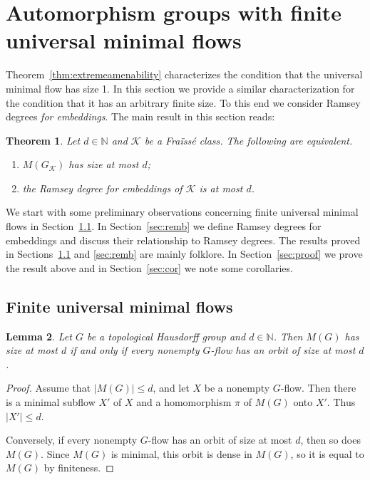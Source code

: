 \documentclass[12pt]{amsart}
\theoremstyle{plain}
\newtheorem{theorem}{Theorem}[section]
\newtheorem{lemma}[theorem]{Lemma}
\theoremstyle{definition}
\begin{document}
\section{Automorphism groups with finite universal minimal flows}

Theorem~\ref{thm:extremeamenability} characterizes the condition that the universal minimal flow has size 1. In this section we provide a similar characterization for the condition that it has an arbitrary finite size.
To this end we consider Ramsey degrees {\em for embeddings}. The main result in this section reads:

\begin{theorem}\label{thm:char}
Let $d\in{\mathbb N}$ and ${\mathcal K}$ be a Fra\"iss\'e class.
The following are equivalent.
\begin{enumerate}
\item $M(G_{\mathcal K})$ has size at most $d$;
\item  the Ramsey degree for embeddings of ${\mathcal K}$ is at most $d$.
\end{enumerate}
\end{theorem}

We start with some preliminary observations concerning finite universal minimal flows in Section~\ref{sec:finiteflow}. 
In Section~\ref{sec:remb} we define Ramsey degrees for embeddings and discuss their relationship to Ramsey 
degrees. The results proved in Sections~\ref{sec:finiteflow} and \ref{sec:remb} are mainly folklore.
In Section~\ref{sec:proof} we prove the result above and in 
Section~\ref{sec:cor}  we note some corollaries.

\subsection{Finite universal minimal flows}\label{sec:finiteflow}

\begin{lemma}\label{lem:orb}
 Let $G$ be a topological Hausdorff group and $d\in\mathbb N$. 
Then $M(G)$ has size at most $d$ if and only if every nonempty $G$-flow has an orbit of size at most $d$.
\end{lemma}

\begin{proof}
Assume that $|M(G)|\le d$, and let $X$ be a nonempty $G$-flow. Then there is a minimal subflow $X'$ of $X$ and 
a homomorphism $\pi$ of $M(G)$ onto $X'$. Thus $|X'|\leq d$.

Conversely, if every nonempty $G$-flow has an orbit of size at most $d$, then so does $M(G)$. Since $M(G)$ is 
minimal, this orbit is dense in $M(G)$, so it is equal to $M(G)$ by finiteness.  
\end{proof}
\end{document}
